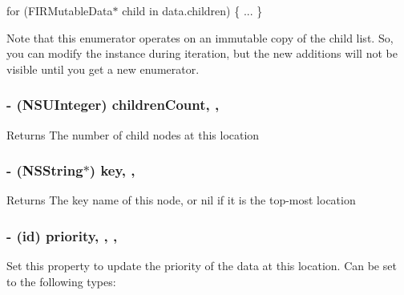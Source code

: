 for (F\+I\+R\+Mutable\+Data$\ast$ child in data.\+children) \{ ... \}

Note that this enumerator operates on an immutable copy of the child list. So, you can modify the instance during iteration, but the new additions will not be visible until you get a new enumerator. \hypertarget{interface_f_i_r_mutable_data_a1368b73f3a5f175f574b50e4db8052cd}{}
\subsubsection[{children\+Count}]{\setlength{\rightskip}{0pt plus 5cm}-\/ (N\+S\+U\+Integer) children\+Count\hspace{0.3cm}{\ttfamily [read]}, {\ttfamily [nonatomic]}, {\ttfamily [assign]}}\label{interface_f_i_r_mutable_data_a1368b73f3a5f175f574b50e4db8052cd}
\begin{DoxyReturn}{Returns}
The number of child nodes at this location 
\end{DoxyReturn}
\hypertarget{interface_f_i_r_mutable_data_aeb2a1a78746a4d916734cb2c3d62f673}{}
\subsubsection[{key}]{\setlength{\rightskip}{0pt plus 5cm}-\/ (N\+S\+String$\ast$) key\hspace{0.3cm}{\ttfamily [read]}, {\ttfamily [nonatomic]}, {\ttfamily [strong]}}\label{interface_f_i_r_mutable_data_aeb2a1a78746a4d916734cb2c3d62f673}
\begin{DoxyReturn}{Returns}
The key name of this node, or nil if it is the top-\/most location 
\end{DoxyReturn}
\hypertarget{interface_f_i_r_mutable_data_a3dd9f79c360f2ffd294554921134859f}{}
\subsubsection[{priority}]{\setlength{\rightskip}{0pt plus 5cm}-\/ (id) priority\hspace{0.3cm}{\ttfamily [read]}, {\ttfamily [write]}, {\ttfamily [nonatomic]}, {\ttfamily [strong]}}\label{interface_f_i_r_mutable_data_a3dd9f79c360f2ffd294554921134859f}
Set this property to update the priority of the data at this location. Can be set to the following types\+:


